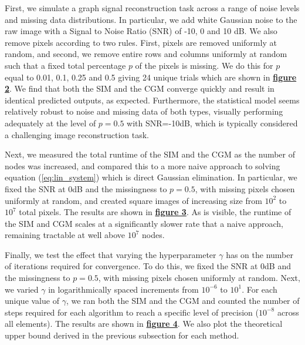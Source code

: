 First, we simulate a graph signal reconstruction task across a range of noise levels and missing data distributions. In particular, we add white Gaussian noise to the raw image with a Signal to Noise Ratio (SNR) of -10, 0 and 10 dB. We also remove pixels according to two rules. First, pixels are removed uniformly at random, and second, we remove entire rows and columns uniformly at random such that a fixed total percentage $p$ of the pixels is missing. We do this for $p$ equal to 0.01, 0.1, 0.25 and 0.5 giving 24 unique trials which are shown in \hyperlink{butterflies}{\textbf{figure 2}}. We find that both the SIM and the CGM converge quickly and result in identical predicted outputs, as expected. Furthermore, the statistical model seems relatively robust to noise and missing data of both types, visually performing adequately at the level of $p=0.5$ with SNR=-10dB, which is typically considered a challenging image reconstruction task.

Next, we measured the total runtime of the SIM and the CGM as the number of nodes was increased, and compared this to a more naive approach to solving equation (\ref{eq:lin_system}) which is direct Gaussian elimination. In particular, we fixed the SNR at 0dB and the missingness to $p=0.5$, with missing pixels chosen uniformly at random, and created square images of increasing size from $10^2$ to $10^7$ total pixels. The results are shown in \hyperlink{runtime}{\textbf{figure 3}}. As is visible, the runtime of the SIM and CGM scales at a significantly slower rate that a naive approach, remaining tractable at well above $10^7$ nodes.

Finally, we test the effect that varying the hyperparameter $\gamma$ has on the number of iterations required for convergence. To do this, we fixed the SNR at 0dB and the missingness to $p=0.5$, with missing pixels chosen uniformly at random. Next, we varied $\gamma$ in logarithmically spaced increments from $10^{-6}$ to $10^1$. For each unique value of $\gamma$, we ran both the SIM and the CGM and counted the number of steps required for each algorithm to reach a specific level of precision ($10^{-8}$ across all elements). The results are shown in \hyperlink{complexity}{\textbf{figure 4}}. We also plot the theoretical upper bound derived in the previous subsection for each method.

